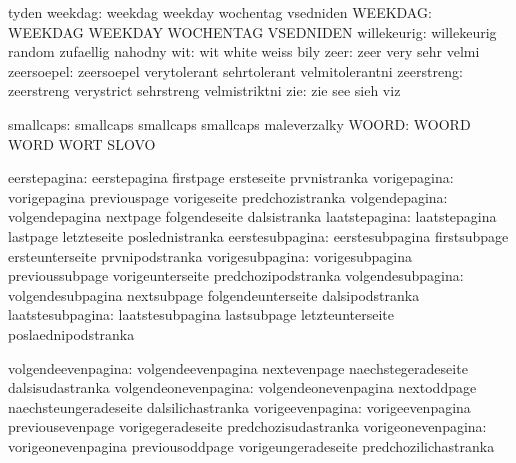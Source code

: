                       tyden
            weekdag:  weekdag              weekday             wochentag
                      vsedniden
            WEEKDAG:  WEEKDAG              WEEKDAY             WOCHENTAG
                      VSEDNIDEN
        willekeurig:  willekeurig          random              zufaellig
                      nahodny
                wit:  wit                  white               weiss
                      bily
               zeer:  zeer                 very                sehr
                      velmi
         zeersoepel:  zeersoepel           verytolerant        sehrtolerant
                      velmitolerantni
         zeerstreng:  zeerstreng           verystrict          sehrstreng
                      velmistriktni
                zie:  zie                  see                 sieh
                      viz

          smallcaps:  smallcaps            smallcaps           smallcaps
                      maleverzalky
              WOORD:  WOORD                WORD                WORT
                      SLOVO

       eerstepagina:  eerstepagina         firstpage           ersteseite
                      prvnistranka
       vorigepagina:  vorigepagina         previouspage        vorigeseite
                      predchozistranka
     volgendepagina:  volgendepagina       nextpage            folgendeseite
                      dalsistranka
      laatstepagina:  laatstepagina        lastpage            letzteseite
                      poslednistranka
    eerstesubpagina:  eerstesubpagina      firstsubpage        ersteunterseite
                      prvnipodstranka
    vorigesubpagina:  vorigesubpagina      previoussubpage     vorigeunterseite
                      predchozipodstranka
  volgendesubpagina:  volgendesubpagina    nextsubpage         folgendeunterseite
                      dalsipodstranka
   laatstesubpagina:  laatstesubpagina     lastsubpage         letzteunterseite
                      poslaednipodstranka

  volgendeevenpagina: volgendeevenpagina   nextevenpage        naechstegeradeseite
                      dalsisudastranka
volgendeonevenpagina: volgendeonevenpagina nextoddpage         naechsteungeradeseite
                      dalsilichastranka
    vorigeevenpagina: vorigeevenpagina     previousevenpage    vorigegeradeseite
                      predchozisudastranka
  vorigeonevenpagina: vorigeonevenpagina   previousoddpage     vorigeungeradeseite
                      predchozilichastranka

